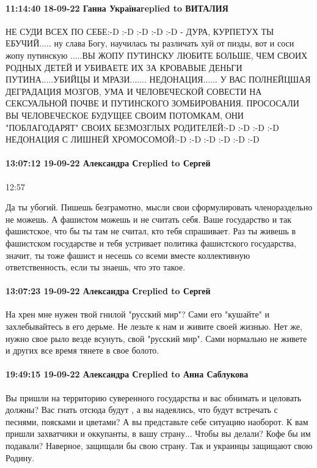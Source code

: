 \paragraph{11:14:40 18-09-22 Ганна Українаreplied to ВИТАЛИЯ 🌹🌹}

НЕ СУДИ ВСЕХ ПО СЕБЕ:-D :-D :-D :-D :-D - ДУРА, КУРПЕТУХ ТЫ ЕБУЧИЙ..... ну
слава Богу, научилась ты различать хуй от пизды, вот и соси жопу путинскую
.....ВЫ ЖОПУ ПУТИНСКУ ЛЮБИТЕ БОЛЬШЕ, ЧЕМ СВОИХ РОДНЫХ ДЕТЕЙ И УБИВАЕТЕ ИХ ЗА
КРОВАВЫЕ ДЕНЬГИ ПУТИНА.....УБИЙЦЫ И МРАЗИ....... НЕДОНАЦИЯ...... У ВАС
ПОЛНЕЙЦШАЯ ДЕГРАДАЦИЯ МОЗГОВ, УМА И ЧЕЛОВЕЧЕСКОЙ СОВЕСТИ НА СЕКСУАЛЬНОЙ ПОЧВЕ И
ПУТИНСКОГО ЗОМБИРОВАНИЯ. ПРОСОСАЛИ ВЫ ЧЕЛОВЕЧЕСКОЕ БУДУЩЕЕ СВОИМ ПОТОМКАМ, ОНИ
"ПОБЛАГОДАРЯТ" СВОИХ БЕЗМОЗГЛЫХ РОДИТЕЛЕЙ:-D :-D :-D :-D   НЕДОНАЦИЯ С ЛИШНЕЙ
ХРОМОСОМОЙ:-D :-D :-D :-D :-D :-D


\paragraph{13:07:12 19-09-22 Александра Сreplied to Сергей}
12:57

Да ты убогий. Пишешь безграмотно, мысли свои сформулировать членораздельно не
можешь. А фашистом можешь и не считать себя. Ваше государство и так фашистское,
что бы ты там не считал, кто тебя спрашивает. Раз ты живешь в фашистском
государстве и тебя устривает политика фашистского государства, значит, ты тоже
фашист и несешь со всеми вместе коллективную ответственность, если ты знаешь,
что это такое.

\paragraph{13:07:23 19-09-22 Александра Сreplied to Сергей}

На хрен мне нужен твой гнилой "русский мир"? Сами его "кушайте" и
захлебывайтесь в его дерьме. Не лезьте к нам и живите своей жизнью. Нет же,
нужно свое рыло везде всунуть, свой "русский мир". Сами нормально не живете и
других все время тянете в свое болото.

\paragraph{19:49:15 19-09-22 Александра Сreplied to Анна Саблукова}

Вы пришли на территорию суверенного государства и вас обнимать и целовать
должны? Вас гнать отсюда будут , а вы надеялись, что будут встречать с песнями,
поясками и цветами? А вы представьте себе ситуацию наоборот. К вам пришли
захватчики и оккупанты, в вашу страну... Чтобы вы делали? Кофе бы им подавали?
Наверное, защищали бы свою страну. Так и украинцы защищают свою Родину.


